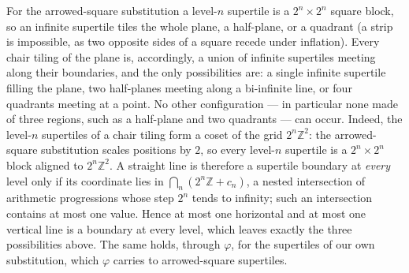 \documentclass[11pt]{article}
\theoremstyle{remark}
\begin{document}
For the arrowed-square substitution a level-$n$ supertile is a $2^n\times2^n$
square block, so an infinite supertile tiles the whole plane, a half-plane, or
a quadrant (a strip is impossible, as two opposite sides of a square recede
under inflation). Every chair tiling of the plane is, accordingly, a union of
infinite supertiles meeting along their boundaries, and the only possibilities
are: a single infinite supertile filling the plane, two half-planes meeting
along a bi-infinite line, or four quadrants meeting at a point. No other
configuration --- in particular none made of three regions, such as a half-plane
and two quadrants --- can occur. Indeed, the level-$n$ supertiles of a chair
tiling form a coset of the grid $2^n\mathbb Z^2$: the arrowed-square substitution
scales positions by $2$, so every level-$n$ supertile is a $2^n\times2^n$ block
aligned to $2^n\mathbb Z^2$. A straight line is therefore a supertile boundary at
\emph{every} level only if its coordinate lies in $\bigcap_{n}(2^n\mathbb
Z+c_n)$, a nested intersection of arithmetic progressions whose step $2^n$ tends
to infinity; such an intersection contains at most one value. Hence at most one
horizontal and at most one vertical line is a boundary at every level, which
leaves exactly the three possibilities above. The same holds, through
$\varphi$, for the supertiles of our own substitution, which $\varphi$ carries
to arrowed-square supertiles.
\end{document}
